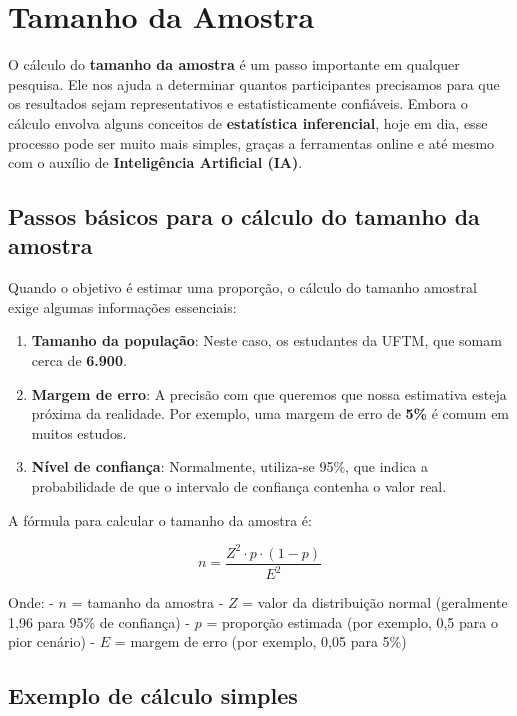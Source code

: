 \documentclass[
]{book}
\providecommand{\tightlist}{%
  \setlength{\itemsep}{0pt}\setlength{\parskip}{0pt}}
\begin{document}
\chapter{Tamanho da Amostra}\label{tamanho-da-amostra}

O cálculo do \textbf{tamanho da amostra} é um passo importante em qualquer pesquisa. Ele nos ajuda a determinar quantos participantes precisamos para que os resultados sejam representativos e estatisticamente confiáveis. Embora o cálculo envolva alguns conceitos de \textbf{estatística inferencial}, hoje em dia, esse processo pode ser muito mais simples, graças a ferramentas online e até mesmo com o auxílio de \textbf{Inteligência Artificial (IA)}.

\section{Passos básicos para o cálculo do tamanho da amostra}\label{passos-buxe1sicos-para-o-cuxe1lculo-do-tamanho-da-amostra}

Quando o objetivo é estimar uma proporção, o cálculo do tamanho amostral exige algumas informações essenciais:

\begin{enumerate}
\def\labelenumi{\arabic{enumi}.}
\tightlist
\item
  \textbf{Tamanho da população}: Neste caso, os estudantes da UFTM, que somam cerca de \textbf{6.900}.
\item
  \textbf{Margem de erro}: A precisão com que queremos que nossa estimativa esteja próxima da realidade. Por exemplo, uma margem de erro de \textbf{5\%} é comum em muitos estudos.
\item
  \textbf{Nível de confiança}: Normalmente, utiliza-se 95\%, que indica a probabilidade de que o intervalo de confiança contenha o valor real.
\end{enumerate}

A fórmula para calcular o tamanho da amostra é:

\[
n = \frac{{Z^2 \cdot p \cdot (1 - p)}}{{E^2}}
\]

Onde:
- \(n\) = tamanho da amostra
- \(Z\) = valor da distribuição normal (geralmente 1,96 para 95\% de confiança)
- \(p\) = proporção estimada (por exemplo, 0,5 para o pior cenário)
- \(E\) = margem de erro (por exemplo, 0,05 para 5\%)

\section{Exemplo de cálculo simples}\label{exemplo-de-cuxe1lculo-simples}
\end{document}
